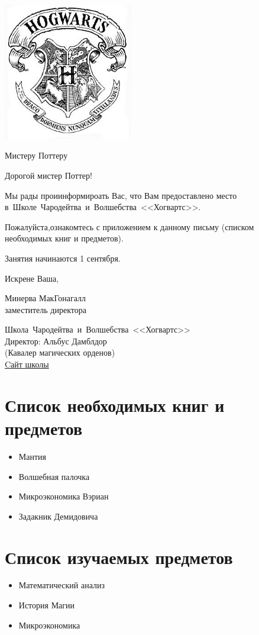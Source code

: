 \documentclass[14pt,a4paper]{report}
\begin{document}
\thispagestyle{empty}
\begin{center}
\includegraphics[height=6cm]{h.jpg}
\end{center}

\vspace{1cm}

{ \fontsize{12}{1}\selectfont Мистеру Поттеру}

\vspace{2.5cm}
Дорогой мистер Поттер!

Мы рады проиинформироать Вас, что Вам предоставлено место в~Школе~Чародейтва~и~Волшебства~<<Хогвартс>>.

Пожалуйста,ознакомтесь с приложением к данному письму (списком необходимых книг и предметов).

Занятия начинаются 1 сентября.

Искрене Ваша,

{}

Минерва МакГонагалл \\
заместитель директора

\vfill

\begin{center}
Школа~Чародейтва~и~Волшебства~<<Хогвартс>> \\
{ \fontsize{10}{1}\selectfont Директор: Альбус Дамблдор}\\{\fontsize{10}{1}\selectfont (Кавалер магических орденов)}\\
\href{http://economy.ranepa.ru/}{Cайт школы}
\end{center}


\newpage
\section{Список необходимых книг и предметов}
\begin{itemize}
\item Мантия
\item Волшебная палочка
\item Микроэкономика Вэриан
\item Задакник Демидовича
\end{itemize}


\newpage
\section{Список изучаемых предметов}
\begin{itemize}
\item Математический анализ
\item История Магии
\item Микроэкономика
\end{itemize}
\end{document}
